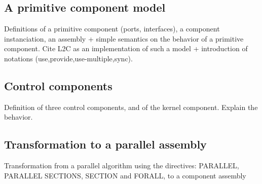 \subsection{A primitive component model}
Definitions of a primitive component (ports, interfaces), a component instanciation, an assembly + simple semantics on the behavior of a primitive component. Cite L2C as an implementation of such a model + introduction of notations (use,provide,use-multiple,sync).

\subsection{Control components}
Definition of three control components, and of the kernel component. Explain the behavior.

\subsection{Transformation to a parallel assembly}
Transformation from a parallel algorithm using the directives: PARALLEL, PARALLEL SECTIONS, SECTION and FORALL, to a component assembly